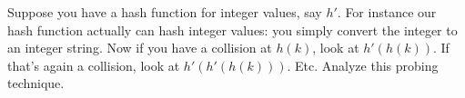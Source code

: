 Suppose you have a hash function for integer values, say $h'$.
For instance our hash function
actually can hash integer values: you simply convert the 
integer to an integer string. 
Now if you have a collision at $h(k)$, look at $h'(h(k))$.
If that's again a collision, look at $h'(h'(h(k)))$.
Etc.
Analyze this probing technique.
